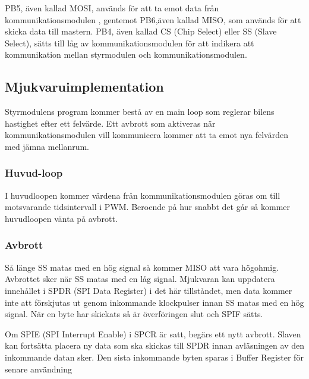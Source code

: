 \documentclass[designspec/spec.tex]{subfiles}
\begin{document}
PB5, även kallad MOSI, används för att ta emot data från kommunikationsmodulen
, gentemot PB6,även kallad MISO, som används för att skicka data till mastern.
PB4, även kallad CS (Chip Select) eller SS (Slave Select), sätts till låg av
kommunikationsmodulen för att indikera att kommunikation mellan styrmodulen och
kommunikationsmodulen.

\subsection{Mjukvaruimplementation}
Styrmodulens program kommer bestå av en main loop som reglerar bilens hastighet
efter ett felvärde. Ett avbrott som aktiveras när kommunikationsmodulen vill
kommunicera kommer att ta emot nya felvärden med jämna mellanrum.

\subsubsection{Huvud-loop}
I huvudloopen kommer värdena från kommunikationsmodulen göras om till
motsvarande tidsintervall i PWM. Beroende på hur snabbt det går så kommer
huvudloopen vänta på avbrott.

\subsubsection{Avbrott}
Så länge SS matas med en hög signal så kommer MISO att vara högohmig. Avbrottet
sker när SS matas med en låg signal. Mjukvaran kan uppdatera innehållet i SPDR
(SPI Data Register) i det här tillståndet, men data kommer inte att förskjutas
ut genom inkommande klockpulser innan SS matas med en hög signal. När en byte
har skickats så är överföringen slut och SPIF sätts. 

Om SPIE (SPI Interrupt Enable) i SPCR är satt, begärs ett nytt avbrott. Slaven
kan fortsätta placera ny data som ska skickas till SPDR innan avläsningen av
den inkommande datan sker. Den sista inkommande byten sparas i Buffer Register
för senare användning
\end{document}
